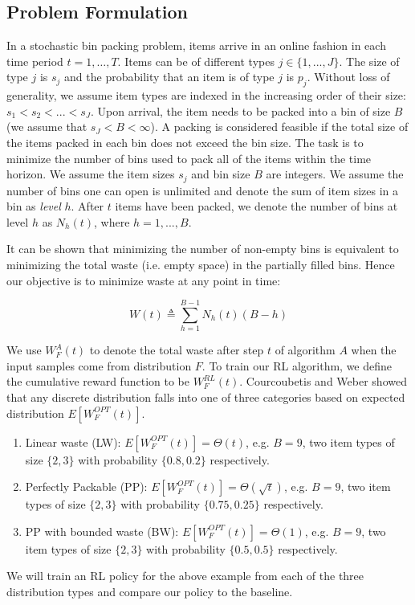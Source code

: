 \documentclass{article}
\begin{document}
\subsection{Problem Formulation} \label{sec: bin_packing_prob_form}
In a stochastic bin packing problem, items arrive in an online fashion in each time period $t = 1, \ldots, T$. Items can be of different types $j \in \{1,...,J\}$. The size of type $j$ is $s_j$ and the probability that an item is of type $j$ is $p_j$. Without loss of generality, we assume item types are indexed in the increasing order of their size: $s_1 < s_2 < ... < s_J$. Upon arrival, the item needs to be packed into a bin of size $B$ (we assume that $s_J < B < \infty$). A packing is considered feasible if the total size of the items packed in each bin does not exceed the bin size. The task is to minimize the number of bins used to pack all of the items within the time horizon. We assume the item sizes $s_j$ and bin size $B$ are integers. We assume the number of bins one can open is unlimited and denote the sum of item sizes in a bin as \emph{level} $h$. After $t$ items have been packed, we denote the number of bins at level $h$ as $N_h(t)$, where $h = 1,...,B$. 

It can be shown that minimizing the number of non-empty bins is equivalent to minimizing the total waste (i.e. empty space) in the partially filled bins. Hence our objective is to minimize waste at any point in time:

\begin{equation}
\label{waste}
W(t) \triangleq \sum_{h=1}^{B-1} N_h(t)(B-h) 
\end{equation}

\noindent We use $W^{A}_{F}(t)$ to denote the total waste after step $t$ of algorithm $A$ when the input samples come from distribution $F$. To train our RL algorithm, we define the cumulative reward function to be $W^{RL}_{F}(t)$. Courcoubetis and Weber \cite{courcobetis1990stability} showed that any discrete distribution falls into one of three categories based on expected distribution $E[W^{OPT}_{F}(t)]$.
\begin{enumerate}
	\item Linear waste (LW): $E[W^{OPT}_{F}(t)] = \Theta(t)$, e.g. $B = 9$, two item types of size $\{2,3\}$ with probability $\{0.8, 0.2\}$ respectively.
	\item Perfectly Packable (PP):  $E[W^{OPT}_{F}(t)] = \Theta(\sqrt{t})$, e.g.  $B = 9$, two item types of size $\{2,3\}$ with probability $\{0.75, 0.25\}$ respectively.
	\item PP with bounded waste (BW): $E[W^{OPT}_{F}(t)] = \Theta(1)$, e.g. $B = 9$, two item types of size $\{2,3\}$ with probability $\{0.5, 0.5\}$ respectively.
\end{enumerate}
We will train an RL policy for the above example from each of the three distribution types and compare our policy to the baseline.
\end{document}
